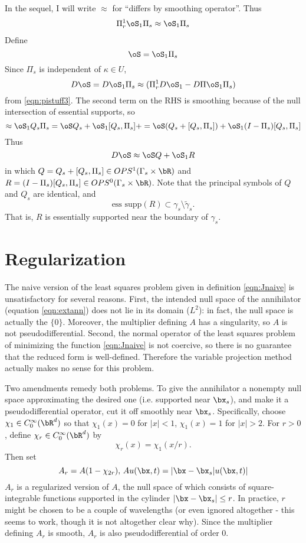 In the sequel, I will write $\approx$ for ``differs by smoothing operator''. Thus
\begin{eqnarray}
\label{eqn:pistuff3}
\Pi^1_r \oS_1 \Pi_s \approx \oS_1 \Pi_s
\end{eqnarray}
Define 
\begin{equation}
\label{osdef}
\oS = \oS_1 \Pi_s
\end{equation}
Since $\Pi_s$ is independent of $\kappa \in U$,
\[
D\oS = D\oS_1 \Pi_s \approx (\Pi^1_r D\oS_1-D\Pi \oS_1 \Pi_s)
\]
from \ref{eqn:pistuff3}. The second term on the RHS is smoothing because of the null intersection of essential supports, so
\[
\approx \oS_1 Q_s \Pi_s = \oS Q_s + \oS_1 [Q_s,\Pi_s]+ = \oS(Q_s+[Q_s,\Pi_s]) + \oS_1(I-\Pi_s)[Q_s,\Pi_s]
\]
Thus
\begin{equation}
\label{eqn:qrel0}
D\oS \approx \oS Q + \oS_1R
\end{equation}
in which $Q=Q_s + [Q_s,\Pi_s] \in OPS^1(\Gamma_s \times \bR)$ and $R = (I-\Pi_s)[Q_s,\Pi_s] \in OPS^0(\Gamma_s \times \bR)$. Note that the principal symbols of $Q$ and $Q_s$ are identical, and 
\begin{equation}
\label{eqn:esssuppr}
\mbox{ess supp}(R) \subset \gamma_s \setminus \tilde{\gamma}_s.
\end{equation}
That is, $R$ is essentially supported near the boundary of $\gamma_s$.

\section{Regularization}
The naive version of the least squares problem given in definition \ref{eqn:Jnaive} is unsatisfactory for several reasons. First, the intended null space of the annihilator (equation \ref{eqn:extann}) does not lie in its domain ($L^2$): in fact, the null space is actually the $\{0\}$. Moreover, the multiplier defining $A$ has a singularity, so $A$ is not pseudodifferential. Second, the normal operator of the least squares problem of minimizing the function \ref{eqn:Jnaive} is not coercive, so there is no guarantee that the reduced form is well-defined. Therefore the variable projection method actually makes no sense for this problem.

Two amendments remedy both problems. To give the annihilator a nonempty null space approximating the desired one (i.e. supported near $\bx_s$), and make it a pseudodifferential operator, cut it off smoothly near $\bx_s$. Specifically, choose $\chi_1 \in C_0^{\infty}(\bR^d)$ so that $\chi_1(x)=0$ for $|x|<1$, $\chi_1(x)=1$ for $|x| >2$. For $r>0$, define $\chi_r \in C_0^{\infty}(\bR^d)$ by
\[
\chi_r(x) = \chi_1(x/r).
\]
Then set 
\[
A_r = A(1-\chi_{2r}), \, Au(\bx,t)=|\bx-\bx_s|u(\bx,t)|
\]
$A_r$ is a regularized version of $A$, the null space of which consists of square-integrable functions supported in the cylinder $|\bx-\bx_s| \le r$. In practice, $r$ might be chosen to be a couple of wavelengths (or even ignored altogether - this seems to work, though it is not altogether clear why). Since the multiplier defining $A_r$ is smooth, $A_r$ is also pseudodifferential of order $0$.

